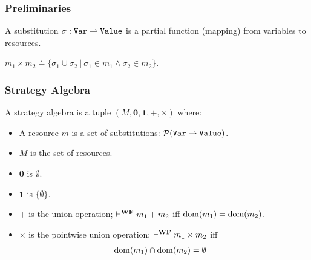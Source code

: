 \newcommand{\substxy}[3]{\textcolor{#1}{[x\mapsto {#2}; y\mapsto {#3}]}}
\newcommand{\subExt}{\boxed{o}}
\newcommand{\supExt}{\boxed{u}}

\begin{frame}[fragile]
    \frametitle{Preliminaries}

\begin{definition}[Substitution] 
    A substitution $\sigma: {\tt Var} \rightharpoonup {\tt Value}$ is a partial function (mapping) from variables to resources.
\end{definition}

\begin{definition} $m_1 \times m_2 \doteq \{ \sigma_1 \cup \sigma_2 ~|~ \sigma_1 \in m_1 \land \sigma_2 \in m_2 \}$.
\end{definition}
    
\end{frame}

\begin{frame}[fragile]
    \frametitle{Strategy Algebra}

\begin{definition} A strategy algebra is a tuple $(M, \mathbf{0}, \mathbf{1}, +, \times)$ where:
    \begin{itemize}
        \item A resource $m$ is a set of substitutions: $\mathcal{P}({\tt Var} \rightharpoonup {\tt Value})$.
        \item $M$ is the set of resources.
        \item $\mathbf{0}$ is $\emptyset$.
        \item $\mathbf{1}$ is $\{\emptyset\}$.
        \item $+$ is the union operation; $\vdash^{\textbf{WF}} m_1 + m_2$ iff $\mathrm{dom}(m_1) = \mathrm{dom}(m_2)$.
        \item $\times$ is the pointwise union operation; $\vdash^{\textbf{WF}} m_1 \times m_2$ iff
        \begin{align*}
            &\mathrm{dom}(m_1) \cap \mathrm{dom}(m_2) = \emptyset
        \end{align*} 
    \end{itemize}
\end{definition}
    
\end{frame}

